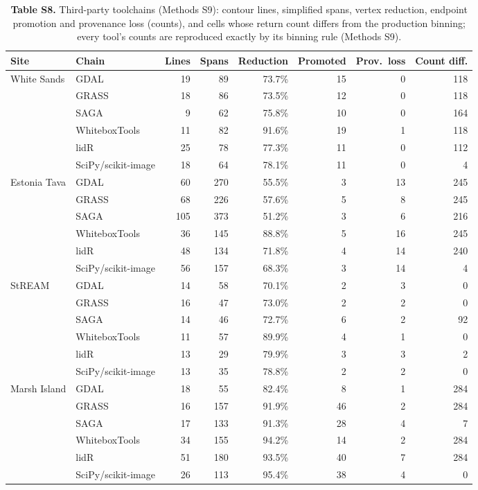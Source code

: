 \documentclass[11pt]{article}
\begin{document}
\begin{table}[!htbp]
\centering
\caption*{\textbf{Table S8.} Third-party toolchains (Methods S9): contour lines, simplified spans, vertex reduction, endpoint promotion and provenance loss (counts), and cells whose return count differs from the production binning; every tool's counts are reproduced exactly by its binning rule (Methods S9).}
\vspace{2mm}
\scriptsize
\setlength{\tabcolsep}{3.5pt}
\begin{tabular}{@{}llrrrrrr@{}}
\toprule
Site & Chain & Lines & Spans & Reduction & Promoted & Prov.\ loss & Count diff. \\
\midrule
White Sands & GDAL & 19 & 89 & 73.7\% & 15 & 0 & 118 \\
 & GRASS & 18 & 86 & 73.5\% & 12 & 0 & 118 \\
 & SAGA & 9 & 62 & 75.8\% & 10 & 0 & 164 \\
 & WhiteboxTools & 11 & 82 & 91.6\% & 19 & 1 & 118 \\
 & lidR & 25 & 78 & 77.3\% & 11 & 0 & 112 \\
 & SciPy/scikit-image & 18 & 64 & 78.1\% & 11 & 0 & 4 \\
Estonia Tava & GDAL & 60 & 270 & 55.5\% & 3 & 13 & 245 \\
 & GRASS & 68 & 226 & 57.6\% & 5 & 8 & 245 \\
 & SAGA & 105 & 373 & 51.2\% & 3 & 6 & 216 \\
 & WhiteboxTools & 36 & 145 & 88.8\% & 5 & 16 & 245 \\
 & lidR & 48 & 134 & 71.8\% & 4 & 14 & 240 \\
 & SciPy/scikit-image & 56 & 157 & 68.3\% & 3 & 14 & 4 \\
StREAM & GDAL & 14 & 58 & 70.1\% & 2 & 3 & 0 \\
 & GRASS & 16 & 47 & 73.0\% & 2 & 2 & 0 \\
 & SAGA & 14 & 46 & 72.7\% & 6 & 2 & 92 \\
 & WhiteboxTools & 11 & 57 & 89.9\% & 4 & 1 & 0 \\
 & lidR & 13 & 29 & 79.9\% & 3 & 3 & 2 \\
 & SciPy/scikit-image & 13 & 35 & 78.8\% & 2 & 2 & 0 \\
Marsh Island & GDAL & 18 & 55 & 82.4\% & 8 & 1 & 284 \\
 & GRASS & 16 & 157 & 91.9\% & 46 & 2 & 284 \\
 & SAGA & 17 & 133 & 91.3\% & 28 & 4 & 7 \\
 & WhiteboxTools & 34 & 155 & 94.2\% & 14 & 2 & 284 \\
 & lidR & 51 & 180 & 93.5\% & 40 & 7 & 284 \\
 & SciPy/scikit-image & 26 & 113 & 95.4\% & 38 & 4 & 0 \\
\bottomrule
\end{tabular}
\end{table}
\end{document}
